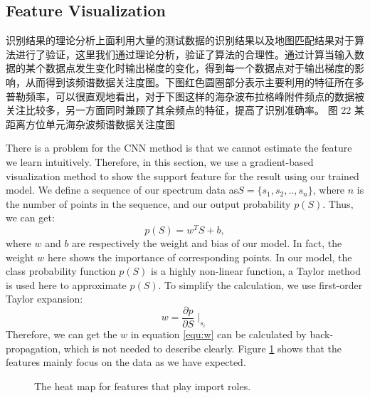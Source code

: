 \subsection{Feature Visualization}

识别结果的理论分析上面利用大量的测试数据的识别结果以及地图匹配结果对于算法进行了验证，这里我们通过理论分析，验证了算法的合理性。通过计算当输入数据的某个数据点发生变化时输出梯度的变化，得到每一个数据点对于输出梯度的影响，从而得到该频谱数据关注度图。下图红色圆圈部分表示主要利用的特征所在多普勒频率，可以很直观地看出，对于下图这样的海杂波布拉格峰附件频点的数据被关注比较多，另一方面同时兼顾了其余频点的特征，提高了识别准确率。 图 22 某距离方位单元海杂波频谱数据关注度图

There is a problem for the CNN method is that we cannot estimate the feature we learn intuitively. Therefore, in this section, we use a gradient-based visualization method to show the support feature for the result using our trained model. We define a sequence of our spectrum data as$ S = \{s_1, s_2, .., s_n\} $, where $n$ is the number of points in the sequence, and our output probability $p(S)$. Thus, we can get:
\begin{equation}
p(S) = w^TS+b,
\end{equation}
where $w$ and $b$ are respectively the weight and bias of our model. In fact, the weight $w$ here shows the importance of corresponding points. In our model, the class probability function $p(S)$ is a highly non-linear function, a Taylor method is used here to approximate $p(S)$. To simplify the calculation, we use first-order Taylor expansion:
\begin{equation}
w = \frac{\partial{p}}{\partial{S}}{\mid}_{s_i}
\label{equ:w}
\end{equation}
Therefore, we can get the $w$ in equation \ref{equ:w} can be calculated by back-propagation, which is not needed to describe clearly. Figure \ref{fig:vis} shows that the features mainly focus on the data as we have expected.
\begin{figure}[!t]
	\centering
	\caption{The heat map for features that play import roles.}
	\label{fig:vis}
\end{figure}
